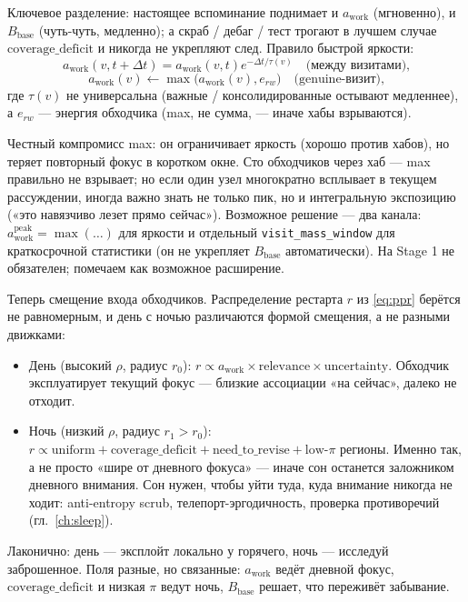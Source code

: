 Ключевое разделение: настоящее вспоминание поднимает и $a_{\text{work}}$
(мгновенно), и $B_{\text{base}}$ (чуть-чуть, медленно); а скраб / дебаг / тест
трогают в лучшем случае $\mathrm{coverage\_deficit}$ и никогда не укрепляют
след. Правило быстрой яркости:
\[
a_{\text{work}}(v,t+\Delta t) = a_{\text{work}}(v,t)e^{-\Delta t/\tau(v)}
\quad \text{(между визитами),}
\]
\[
a_{\text{work}}(v) \leftarrow \max\!\bigl(a_{\text{work}}(v), e_{rw}\bigr)
\quad \text{(genuine-визит),}
\]
где $\tau(v)$ не универсальна (важные / консолидированные остывают медленнее),
а $e_{rw}$ --- энергия обходчика (max, не сумма, --- иначе хабы взрываются).

\begin{openq}
Честный компромисс max: он ограничивает яркость (хорошо против хабов), но
теряет повторный фокус в коротком окне. Сто обходчиков через хаб --- max
правильно не взрывает; но если один узел многократно всплывает в текущем
рассуждении, иногда важно знать не только пик, но и интегральную экспозицию
(«это навязчиво лезет прямо сейчас»). Возможное решение --- два канала:
$a^{\text{peak}}_{\text{work}} = \max(\ldots)$ для яркости и отдельный
\texttt{visit\_mass\_window} для краткосрочной статистики (он не укрепляет
$B_{\text{base}}$ автоматически). На Stage 1 не обязателен; помечаем как
возможное расширение.
\end{openq}

Теперь смещение входа обходчиков. Распределение рестарта $r$ из
\eqref{eq:ppr} берётся не равномерным, и день с ночью различаются формой
смещения, а не разными движками:
\begin{itemize}
\item День (высокий $\rho$, радиус $r_0$): $r \propto a_{\text{work}} \times
\mathrm{relevance} \times \mathrm{uncertainty}$. Обходчик эксплуатирует текущий
фокус --- близкие ассоциации «на сейчас», далеко не отходит.
\item Ночь (низкий $\rho$, радиус $r_1 > r_0$): $r \propto \mathrm{uniform} +
\mathrm{coverage\_deficit} + \mathrm{need\_to\_revise} + \text{low-}\pi$ регионы.
Именно так, а не просто «шире от дневного фокуса» --- иначе сон останется
заложником дневного внимания. Сон нужен, чтобы уйти туда, куда внимание
никогда не ходит: anti-entropy scrub, телепорт-эргодичность, проверка
противоречий (гл.~\ref{ch:sleep}).
\end{itemize}

Лаконично: день --- эксплойт локально у горячего, ночь --- исследуй заброшенное.
Поля разные, но связанные: $a_{\text{work}}$ ведёт дневной фокус,
$\mathrm{coverage\_deficit}$ и низкая $\pi$ ведут ночь, $B_{\text{base}}$ решает,
что переживёт забывание.

